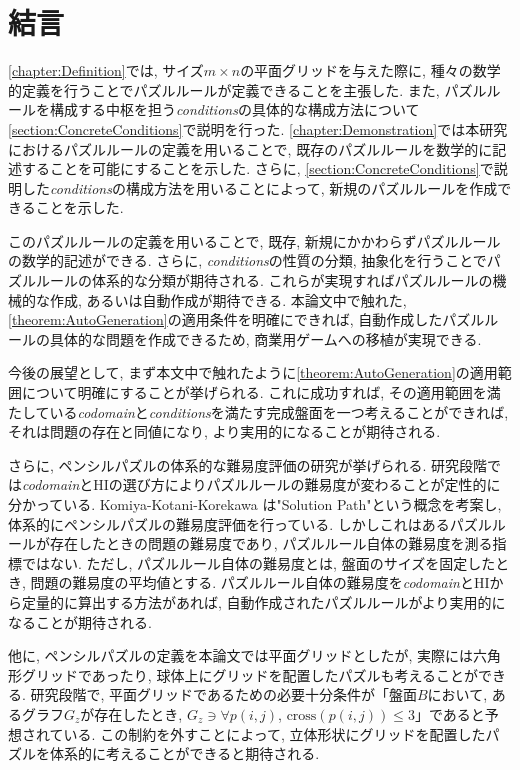 \chapter{結言}
\cref{chapter:Definition}では, サイズ$m\times n$の平面グリッドを与えた際に, 種々の数学的定義を行うことでパズルルールが定義できることを主張した. また, パズルルールを構成する中枢を担う\textit{conditions}の具体的な構成方法について\cref{section:ConcreteConditions}で説明を行った. \cref{chapter:Demonstration}では本研究におけるパズルルールの定義を用いることで, 既存のパズルルールを数学的に記述することを可能にすることを示した. さらに, \cref{section:ConcreteConditions}で説明した\textit{conditions}の構成方法を用いることによって, 新規のパズルルールを作成できることを示した.

このパズルルールの定義を用いることで, 既存, 新規にかかわらずパズルルールの数学的記述ができる. さらに, \textit{conditions}の性質の分類, 抽象化を行うことでパズルルールの体系的な分類が期待される. これらが実現すればパズルルールの機械的な作成, あるいは自動作成が期待できる. 本論文中で触れた, \cref{theorem:AutoGeneration}の適用条件を明確にできれば, 自動作成したパズルルールの具体的な問題を作成できるため, 商業用ゲームへの移植が実現できる.

今後の展望として, まず本文中で触れたように\cref{theorem:AutoGeneration}の適用範囲について明確にすることが挙げられる. これに成功すれば, その適用範囲を満たしている\textit{codomain}と\textit{conditions}を満たす完成盤面を一つ考えることができれば, それは問題の存在と同値になり, より実用的になることが期待される.

さらに, ペンシルパズルの体系的な難易度評価の研究が挙げられる. 研究段階では\textit{codomain}とHIの選び方によりパズルルールの難易度が変わることが定性的に分かっている. Komiya-Kotani-Korekawa \cite{Komiya2010}は"Solution Path"という概念を考案し, 体系的にペンシルパズルの難易度評価を行っている. しかしこれはあるパズルルールが存在したときの問題の難易度であり, パズルルール自体の難易度を測る指標ではない. ただし, パズルルール自体の難易度とは, 盤面のサイズを固定したとき, 問題の難易度の平均値とする. パズルルール自体の難易度を\textit{codomain}とHIから定量的に算出する方法があれば, 自動作成されたパズルルールがより実用的になることが期待される.

他に, ペンシルパズルの定義を本論文では平面グリッドとしたが, 実際には六角形グリッドであったり, 球体上にグリッドを配置したパズルも考えることができる. 研究段階で, 平面グリッドであるための必要十分条件が「盤面$B$において, あるグラフ$G_z$が存在したとき, $G_z \ni \forall p(i,j)$, $\text{cross}(p(i,j))\le3$」であると予想されている. この制約を外すことによって, 立体形状にグリッドを配置したパズルを体系的に考えることができると期待される.